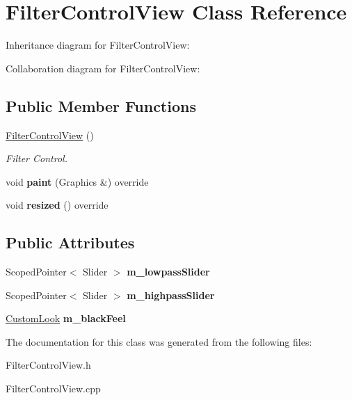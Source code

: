 \hypertarget{class_filter_control_view}{}\section{Filter\+Control\+View Class Reference}
\label{class_filter_control_view}


Inheritance diagram for Filter\+Control\+View\+:


Collaboration diagram for Filter\+Control\+View\+:
\subsection*{Public Member Functions}
\begin{DoxyCompactItemize}
\item 
\hyperlink{class_filter_control_view_ab1fe8cdd41b111dc625ebfd8b86887c0}{Filter\+Control\+View} ()\hypertarget{class_filter_control_view_ab1fe8cdd41b111dc625ebfd8b86887c0}{}\label{class_filter_control_view_ab1fe8cdd41b111dc625ebfd8b86887c0}

\begin{DoxyCompactList}\small\item\em Filter Control. \end{DoxyCompactList}\item 
void {\bfseries paint} (Graphics \&) override\hypertarget{class_filter_control_view_a5c3378523b049f4988f98324fa4dee09}{}\label{class_filter_control_view_a5c3378523b049f4988f98324fa4dee09}

\item 
void {\bfseries resized} () override\hypertarget{class_filter_control_view_af096d7991fd0caf80ae77428f0c5e8ae}{}\label{class_filter_control_view_af096d7991fd0caf80ae77428f0c5e8ae}

\end{DoxyCompactItemize}
\subsection*{Public Attributes}
\begin{DoxyCompactItemize}
\item 
Scoped\+Pointer$<$ Slider $>$ {\bfseries m\+\_\+lowpass\+Slider}\hypertarget{class_filter_control_view_a3e9a23f0a2c5fb48082438dd3151ec3c}{}\label{class_filter_control_view_a3e9a23f0a2c5fb48082438dd3151ec3c}

\item 
Scoped\+Pointer$<$ Slider $>$ {\bfseries m\+\_\+highpass\+Slider}\hypertarget{class_filter_control_view_aa85c312f5c9461ea07f466bc6a4baf77}{}\label{class_filter_control_view_aa85c312f5c9461ea07f466bc6a4baf77}

\item 
\hyperlink{class_custom_look}{Custom\+Look} {\bfseries m\+\_\+black\+Feel}\hypertarget{class_filter_control_view_addbeb727ac56339c9c16d0dcb7c45938}{}\label{class_filter_control_view_addbeb727ac56339c9c16d0dcb7c45938}

\end{DoxyCompactItemize}


The documentation for this class was generated from the following files\+:\begin{DoxyCompactItemize}
\item 
Filter\+Control\+View.\+h\item 
Filter\+Control\+View.\+cpp\end{DoxyCompactItemize}
